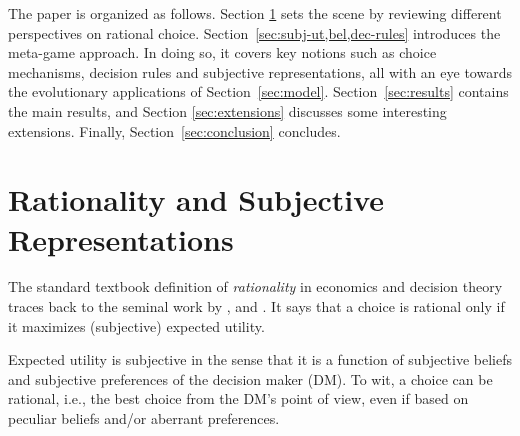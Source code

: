 \documentclass[fleqn,reqno,12pt]{article}
\theoremstyle{Satz}
\theoremstyle{Bsp}
\begin{document}

The paper is organized as follows. Section \ref{sec:rati--subj} sets the scene by reviewing
different perspectives on rational choice. Section~\ref{sec:subj-ut,bel,dec-rules}
introduces the meta-game approach. In doing so, it covers key notions such as choice mechanisms,
decision rules and subjective representations, all with an eye towards the evolutionary applications
of Section~\ref{sec:model}. Section~\ref{sec:results} contains
the main results, and Section \ref{sec:extensions} discusses some
interesting extensions. Finally, Section~\ref{sec:conclusion} concludes.

\section{Rationality and Subjective Representations}
\label{sec:rati--subj}

The standard textbook definition of \textit{rationality} in economics and decision theory
traces back to the seminal work by \citet{deFinetti37}, \citet{Neumannvon-NeumannMorgenstern1944:Theory-of-Games}
and \citet{Savage1954:The-Foundations}. It says that a choice is rational only if it maximizes
(subjective) expected utility.


\noindent Expected utility is subjective in the sense that it is a function of subjective
beliefs and subjective preferences of the decision maker (DM). To wit, a choice can be
rational, i.e., the best choice from the DM's point of view, even if based on peculiar beliefs
and/or aberrant preferences. %
\end{document}
